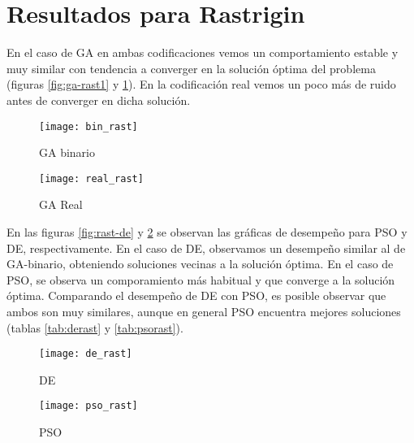 \documentclass[letterpaper,12pt]{article}
\theoremstyle{definition}
\begin{document}
\section{Resultados para Rastrigin}

En el caso de GA en ambas codificaciones vemos un comportamiento estable y muy similar con tendencia a converger en la solución óptima del problema (figuras \ref{fig:ga-rast1} y \ref{fig:ga-rast2}). En la codificación real vemos un poco más de ruido antes de converger en dicha solución.

\medskip
\begin{figure}[h!]
    \texttt{[image: bin\_rast]}
    \caption{GA binario}
    \label{fig:ga-rast1} 
  \endminipage\hfill
    \texttt{[image: real\_rast]}
    \caption{GA Real}
    \label{fig:ga-rast2} 
  \endminipage\hfill
\end{figure}

En las figuras \ref{fig:rast-de} y \ref{fig:rast-pso} se observan las gráficas de desempeño para PSO y DE, respectivamente. En el caso de DE, observamos un desempeño similar al de GA-binario, obteniendo soluciones vecinas a la solución óptima. En el caso de PSO, se observa un comporamiento más habitual y que converge a la solución óptima. Comparando el desempeño de DE con PSO, es posible observar que ambos son muy similares, aunque en general PSO encuentra mejores soluciones (tablas \ref{tab:derast} y \ref{tab:psorast}).

\begin{figure}[!h]
      \texttt{[image: de\_rast]}
      \caption{DE}
      \label{fig:rast-de}
    \endminipage\hfill
      \texttt{[image: pso\_rast]}
      \caption{PSO}
      \label{fig:rast-pso}
    \endminipage\hfill
    
 \end{figure}
\end{document}
